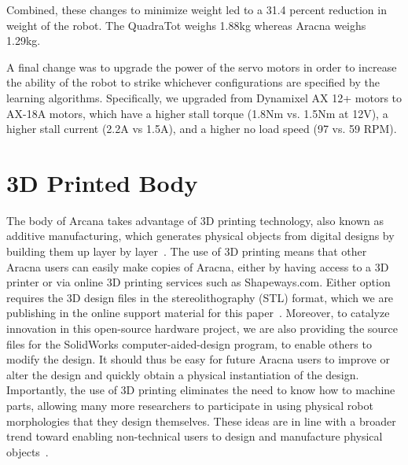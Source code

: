 \documentclass[letterpaper]{article}
\begin{document}
Combined, these changes to minimize weight led to a 31.4 percent reduction in weight of the robot. The QuadraTot weighs 1.88kg whereas Aracna weighs 1.29kg.

A final change was to upgrade the power of the servo motors in order to increase the ability of the robot to strike whichever configurations are specified by the learning algorithms. Specifically, we upgraded from Dynamixel AX 12+ motors to AX-18A motors, which have a higher stall torque (1.8Nm vs. 1.5Nm at 12V), a higher stall current (2.2A vs 1.5A), and a higher no load speed (97 vs. 59 RPM).





\section{3D Printed Body}

The body of Arcana takes advantage of 3D printing technology, also known as additive manufacturing, which generates physical objects from digital designs by building them up layer by layer~\citep{gibson2009additive, lipson2010factory}. The use of 3D printing means that other Aracna users can easily make copies of Aracna, either by having access to a 3D printer or via online 3D printing services such as Shapeways.com. Either option requires the 3D design files in the stereolithography (STL) format, which we are publishing in the online support material for this paper~\citep{WEB}. Moreover, to catalyze innovation in this open-source hardware project, we are also providing the source files for the SolidWorks computer-aided-design program, to enable others to modify the design. It should thus be easy for future Aracna users to improve or alter the design and quickly obtain a physical instantiation of the design. Importantly, the use of 3D printing eliminates the need to know how to machine parts, allowing many more researchers to participate in using physical robot morphologies that they design themselves. These ideas are in line with a broader trend toward enabling non-technical users to design and manufacture physical objects~\citep{clune2011objects, clune2011endless, lipson2010factory}.
\end{document}
